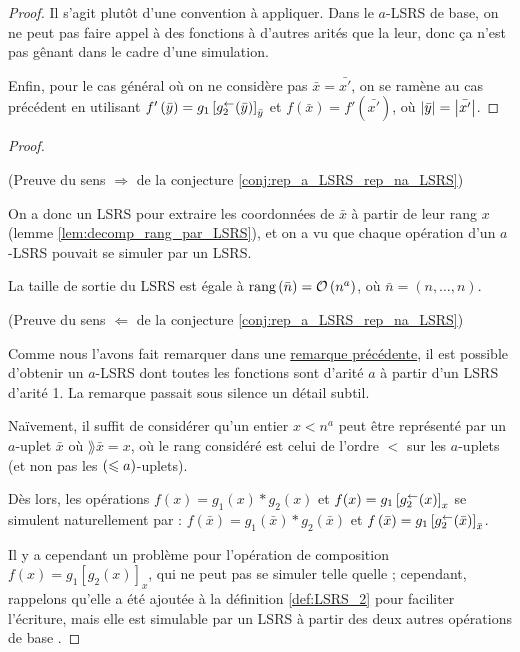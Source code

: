 \begin{proof}
		Il s'agit plutôt d'une convention à appliquer. Dans le $a$-LSRS de base, on ne peut pas faire appel à des fonctions à d'autres arités que la leur, donc ça n'est pas gênant dans le cadre d'une simulation.
		

		
		Enfin, pour le cas général où on ne considère pas $\bar{x} = \bar{x'}$, on se ramène au cas précédent en utilisant $f'\left( \bar{y} \right) = g_1\left[ g_2^{\leftarrow}(\bar{y}) \right]_{\bar{y}}$ et $f\left( \bar{x} \right) = f'\left( \bar{x'} \right)$, où $\left|\bar{y}\right| = \left|\bar{x'}\right|$.
		
	\end{proof}
	
	
	\begin{proof} \textcolor{white}{T} %
		
		(Preuve du sens $\Rightarrow$ de la conjecture \ref{conj:rep_a_LSRS_rep_na_LSRS})
		
		On a donc un LSRS pour extraire les coordonnées de $\bar{x}$ à partir de leur rang $x$ (lemme \ref{lem:decomp_rang_par_LSRS}), et on a vu que chaque opération d'un $a$-LSRS pouvait se simuler par un LSRS.
		
		La taille de sortie du LSRS est égale à $\text{rang}\left( \bar{n} \right) = \mathcal{O}\left( n ^a \right)$, où $\bar{n} = \left( n, \dots, n\right)$.
		
		\espace
		
		(Preuve du sens $\Leftarrow$ de la conjecture \ref{conj:rep_a_LSRS_rep_na_LSRS})
		
		Comme nous l'avons fait remarquer dans une \hyperref[rmq:choix_arites]{remarque précédente}, il est possible d'obtenir un $a$-LSRS dont toutes les fonctions sont d'arité $a$ à partir d'un LSRS d'arité 1. La remarque passait sous silence un détail subtil.
		
		Naïvement, il suffit de considérer qu'un entier $x < n^a$ peut être représenté par un $a$-uplet $\bar{x}$ où $\rang{\bar{x}} = x$, où le rang considéré est celui de l'ordre $<$ sur les $a$-uplets (et non pas les $\left( \leqslant a \right)$-uplets).
		
		Dès lors, les opérations $f(x) = g_1(x) * g_2(x)$ et $f(x) = g_1\left[ g_2^{\leftarrow}(x) \right]_{x}$ se simulent naturellement par : $f\left(\bar{x}\right) = g_1\left(\bar{x}\right) * g_2\left(\bar{x}\right)$ et $f\left(\bar{x}\right) = g_1\left[ g_2^{\leftarrow}(\bar{x}) \right]_{\bar{x}}$.
		
		Il y a cependant un problème pour l'opération de composition $f(x) = g_1\left[g_2(x)\right]_x$, qui ne peut pas se simuler telle quelle ; cependant, rappelons qu'elle a été ajoutée à la définition \ref{def:LSRS_2} pour faciliter l'écriture, mais elle est simulable par un LSRS à partir des deux autres opérations de base \cite{GrandjeanSchwentick2002}.
	\end{proof}
	
